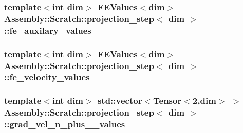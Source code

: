 \subsubsection[{fe\+\_\+auxilary\+\_\+values}]{\setlength{\rightskip}{0pt plus 5cm}template$<$int dim$>$ F\+E\+Values$<$dim$>$ {\bf Assembly\+::\+Scratch\+::projection\+\_\+step}$<$ dim $>$\+::fe\+\_\+auxilary\+\_\+values}\label{struct_assembly_1_1_scratch_1_1projection__step_a3b5a0afe1eaf675d173af8ffd7663e29}
\hypertarget{struct_assembly_1_1_scratch_1_1projection__step_af91b8e433a9a308d66f5cbdbc2dd5a7b}{}
\subsubsection[{fe\+\_\+velocity\+\_\+values}]{\setlength{\rightskip}{0pt plus 5cm}template$<$int dim$>$ F\+E\+Values$<$dim$>$ {\bf Assembly\+::\+Scratch\+::projection\+\_\+step}$<$ dim $>$\+::fe\+\_\+velocity\+\_\+values}\label{struct_assembly_1_1_scratch_1_1projection__step_af91b8e433a9a308d66f5cbdbc2dd5a7b}
\hypertarget{struct_assembly_1_1_scratch_1_1projection__step_abc3d9d363dff0cc1bbf8631afc2c777a}{}
\subsubsection[{grad\+\_\+vel\+\_\+n\+\_\+plus\+\_\+1\+\_\+values}]{\setlength{\rightskip}{0pt plus 5cm}template$<$int dim$>$ std\+::vector$<$Tensor$<$2,dim$>$ $>$ {\bf Assembly\+::\+Scratch\+::projection\+\_\+step}$<$ dim $>$\+::grad\+\_\+vel\+\_\+n\+\_\+plus\+\_\+\_\+values}\label{struct_assembly_1_1_scratch_1_1projection__step_abc3d9d363dff0cc1bbf8631afc2c777a}
\hypertarget{struct_assembly_1_1_scratch_1_1projection__step_a75ecf1c6d8aa564824cc3b3376ca08f9}{}

